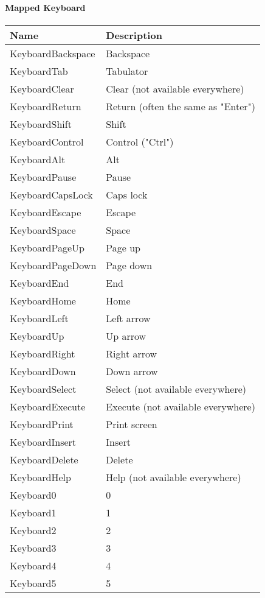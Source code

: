 \paragraph{Mapped Keyboard}
\begin{center}
	\centering
	\begin{longtable}{ | l | p{10cm} |}
	\hline
	Name	& Description \\ \hline
	KeyboardBackspace		&	Backspace\\
	KeyboardTab				&	Tabulator\\
	KeyboardClear			&	Clear (not available everywhere)\\
	KeyboardReturn			&	Return (often the same as "Enter")\\
	KeyboardShift			&	Shift\\
	KeyboardControl			&	Control ("Ctrl")\\
	KeyboardAlt				&	Alt\\
	KeyboardPause			&	Pause\\
	KeyboardCapsLock		&	Caps lock\\
	KeyboardEscape			&	Escape\\
	KeyboardSpace			&	Space\\
	KeyboardPageUp			&	Page up\\
	KeyboardPageDown		&	Page down\\
	KeyboardEnd				&	End\\
	KeyboardHome			&	Home\\
	KeyboardLeft			&	Left arrow\\
	KeyboardUp				&	Up arrow\\
	KeyboardRight			&	Right arrow\\
	KeyboardDown			&	Down arrow\\
	KeyboardSelect			&	Select (not available everywhere)\\
	KeyboardExecute			&	Execute (not available everywhere)\\
	KeyboardPrint			&	Print screen\\
	KeyboardInsert			&	Insert\\
	KeyboardDelete			&	Delete\\
	KeyboardHelp			&	Help (not available everywhere)\\
	Keyboard0				&	0\\
	Keyboard1				&	1\\
	Keyboard2				&	2\\
	Keyboard3				&	3\\
	Keyboard4				&	4\\
	Keyboard5				&	5\\

\end{longtable}
\end{center}
